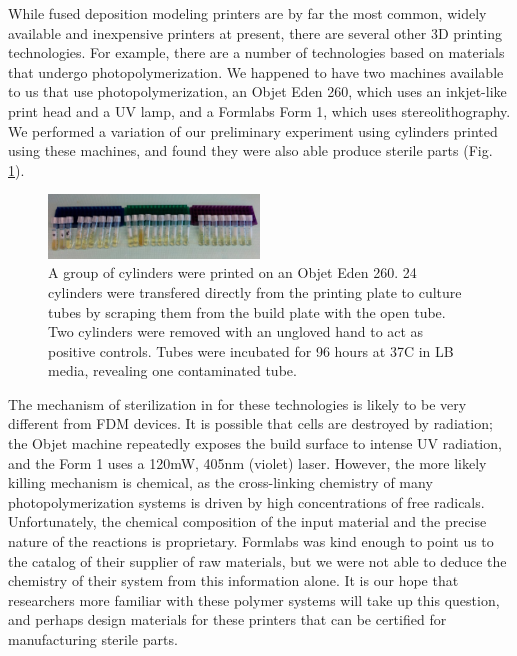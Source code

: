\begin{refsection}
While fused deposition modeling printers are by far the most common,
widely available and inexpensive printers at present, there are
several other 3D printing technologies. For example, there are a
number of technologies based on materials that undergo
photopolymerization. We happened to have two machines available to us
that use photopolymerization, an Objet Eden 260, which uses an
inkjet-like print head and a UV lamp, and a Formlabs Form 1, which
uses stereolithography. We performed a variation of our preliminary
experiment using cylinders printed using these machines, and found
they were also able produce sterile parts (Fig. \ref{objet}). 

\begin{figure}
  \centering
    \includegraphics[width=0.5\textwidth]{sterility/figures/Fig10}
 
    \caption{ A group of cylinders were printed on an Objet Eden
      260. 24 cylinders were transfered directly from the printing
      plate to culture tubes by scraping them from the build plate
      with the open tube. Two cylinders were removed with an ungloved
      hand to act as positive controls. Tubes were incubated for 96
      hours at 37C in LB media, revealing one contaminated tube. }
 
    \label{objet}
\end{figure}

The mechanism of sterilization in for these technologies is likely to
be very different from FDM devices. It is possible that cells are
destroyed by radiation; the Objet machine repeatedly exposes the build
surface to intense UV radiation, and the Form 1 uses a 120mW, 405nm
(violet) laser. However, the more likely killing mechanism is
chemical, as the cross-linking chemistry of many photopolymerization
systems is driven by high concentrations of free radicals.
Unfortunately, the chemical composition of the input material and the
precise nature of the reactions is proprietary. Formlabs was kind
enough to point us to the catalog of their supplier of raw materials,
but we were not able to deduce the chemistry of their system from this
information alone. It is our hope that researchers more familiar with
these polymer systems will take up this question, and perhaps design
materials for these printers that can be certified for manufacturing
sterile parts.

\printbibliography[heading=subbibliography]

\end{refsection}
